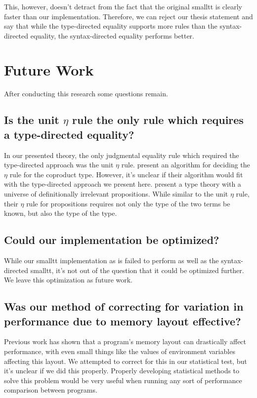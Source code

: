 \documentclass[sigplan,nonacm]{acmart}
\begin{document}
This, however, doesn't detract from the fact that the original smalltt is clearly faster than our implementation.
Therefore, we can reject our thesis statement and say that while the type-directed equality supports more rules than the syntax-directed equality, the syntax-directed equality performs better.

\section{Future Work}

After conducting this research some questions remain.

\subsection{Is the unit $\eta$ rule the only rule which requires a type-directed equality?}

In our presented theory, the only judgmental equality rule which required the type-directed approach was the unit $\eta$ rule.
\citet{altenkirch2001} present an algorithm for deciding the $\eta$ rule for the coproduct type.
However, it's unclear if their algorithm would fit with the type-directed approach we present here.
\citet{gilbert2019} present a type theory with a universe of definitionally irrelevant propositions.
While similar to the unit $\eta$ rule, their $\eta$ rule for propositions requires not only the type of the two terms be known, but also the type of the type.

\subsection{Could our implementation be optimized?}

While our smalltt implementation as is failed to perform as well as the syntax-directed smalltt, it's not out of the question that it could be optimized further.
We leave this optimization as future work.

\subsection{Was our method of correcting for variation in performance due to memory layout effective?}

Previous work has shown that a program's memory layout can drastically affect performance, with even small things like the values of environment variables affecting this layout.
We attempted to correct for this in our statistical test, but it's unclear if we did this properly.
Properly developing statistical methods to solve this problem would be very useful when running any sort of performance comparison between programs.

\newpage


\end{document}
